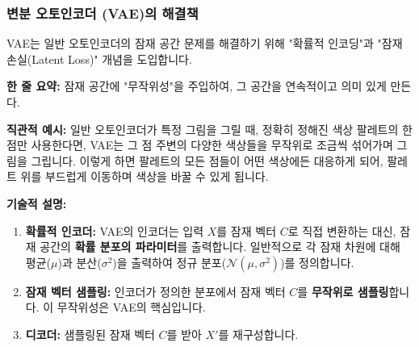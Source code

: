 \documentclass[11pt,a4paper]{article}
\theoremstyle{definition}
\begin{document}
\subsubsection{변분 오토인코더 (VAE)의 해결책}
VAE는 일반 오토인코더의 잠재 공간 문제를 해결하기 위해 "확률적 인코딩"과 "잠재 손실(Latent Loss)" 개념을 도입합니다.

\begin{tcolorbox}[conceptbox, title=변분 오토인코더 (VAE)의 핵심 아이디어]
\textbf{한 줄 요약:} 잠재 공간에 "무작위성"을 주입하여, 그 공간을 연속적이고 의미 있게 만든다.

\textbf{직관적 예시:} 일반 오토인코더가 특정 그림을 그릴 때, 정확히 정해진 색상 팔레트의 한 점만 사용한다면, VAE는 그 점 주변의 다양한 색상들을 무작위로 조금씩 섞어가며 그림을 그립니다. 이렇게 하면 팔레트의 모든 점들이 어떤 색상에든 대응하게 되어, 팔레트 위를 부드럽게 이동하며 색상을 바꿀 수 있게 됩니다.

\textbf{기술적 설명:}
\begin{enumerate}
    \item \textbf{확률적 인코더:} VAE의 인코더는 입력 $X$를 잠재 벡터 $C$로 직접 변환하는 대신, 잠재 공간의 \textbf{확률 분포의 파라미터}를 출력합니다. 일반적으로 각 잠재 차원에 대해 평균($\mu$)과 분산($\sigma^2$)을 출력하여 정규 분포($\mathcal{N}(\mu, \sigma^2)$)를 정의합니다.
    \item \textbf{잠재 벡터 샘플링:} 인코더가 정의한 분포에서 잠재 벡터 $C$를 \textbf{무작위로 샘플링}합니다. 이 무작위성은 VAE의 핵심입니다.
    \item \textbf{디코더:} 샘플링된 잠재 벡터 $C$를 받아 $X'$를 재구성합니다.
\end{enumerate}
\end{tcolorbox}
\end{document}
